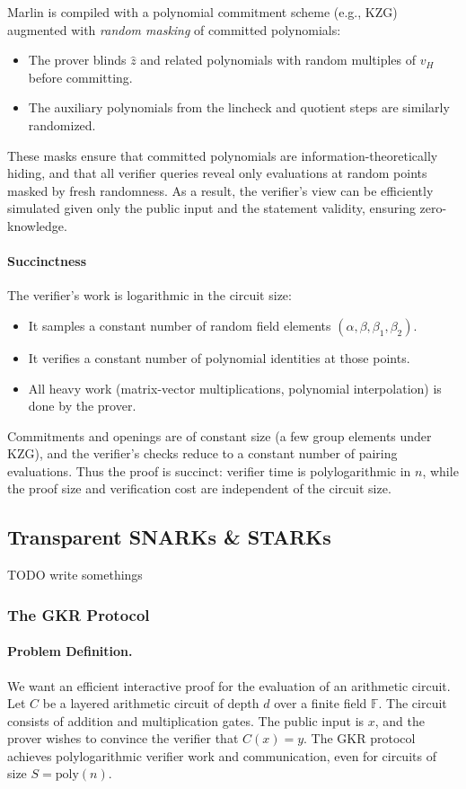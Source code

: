 Marlin is compiled with a polynomial commitment scheme (e.g., KZG) augmented with \emph{random masking} of committed polynomials:
\begin{itemize}
    \item The prover blinds $\hat z$ and related polynomials with random multiples of $v_H$ before committing.
    \item The auxiliary polynomials from the lincheck and quotient steps are similarly randomized.
\end{itemize}
These masks ensure that committed polynomials are information-theoretically hiding, and that all verifier queries reveal only evaluations at random points masked by fresh randomness. As a result, the verifier’s view can be efficiently simulated given only the public input and the statement validity, ensuring zero-knowledge.


\paragraph{Succinctness}

The verifier’s work is logarithmic in the circuit size:
\begin{itemize}
    \item It samples a constant number of random field elements $(\alpha,\beta,\beta_1,\beta_2)$.
    \item It verifies a constant number of polynomial identities at those points.
    \item All heavy work (matrix-vector multiplications, polynomial interpolation) is done by the prover.
\end{itemize}
Commitments and openings are of constant size (a few group elements under KZG), and the verifier’s checks reduce to a constant number of pairing evaluations. Thus the proof is succinct: verifier time is polylogarithmic in $n$, while the proof size and verification cost are independent of the circuit size.


\subsection{Transparent SNARKs \& STARKs}

TODO write somethings

\subsubsection{The GKR Protocol}

\paragraph{Problem Definition.} 
We want an efficient interactive proof for the evaluation of an arithmetic circuit. 
Let $C$ be a layered arithmetic circuit of depth $d$ over a finite field $\mathbb{F}$. 
The circuit consists of addition and multiplication gates. The public input is $x$, and the prover wishes to convince the verifier that $C(x) = y$. 
The GKR protocol achieves polylogarithmic verifier work and communication, even for circuits of size $S = \mathrm{poly}(n)$.

